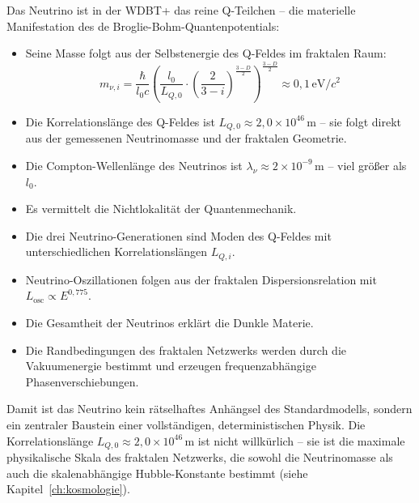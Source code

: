 Das Neutrino ist in der WDBT+ das reine Q-Teilchen – die materielle Manifestation des de Broglie-Bohm-Quantenpotentials:

\begin{itemize}
    \item Seine Masse folgt aus der Selbstenergie des Q-Feldes im fraktalen Raum:
    \[
    m_{\nu,i} = \frac{\hbar}{l_0 c} \left( \frac{l_0}{L_{Q,0}} \cdot \left(\frac{2}{3-i}\right)^{\frac{3-D}{2}} \right)^{\frac{3-D}{2}} \approx 0{,}1 \, \text{eV}/c^2
    \]
    \item Die Korrelationslänge des Q-Feldes ist \( L_{Q,0} \approx 2{,}0 \times 10^{46} \, \text{m} \) – sie folgt direkt aus der gemessenen Neutrinomasse und der fraktalen Geometrie.
    \item Die Compton-Wellenlänge des Neutrinos ist \( \lambda_\nu \approx 2 \times 10^{-9} \, \text{m} \) – viel größer als \( l_0 \).
    \item Es vermittelt die Nichtlokalität der Quantenmechanik.
    \item Die drei Neutrino-Generationen sind Moden des Q-Feldes mit unterschiedlichen Korrelationslängen \( L_{Q,i} \).
    \item Neutrino-Oszillationen folgen aus der fraktalen Dispersionsrelation mit \( L_{\text{osc}} \propto E^{0,775} \).
    \item Die Gesamtheit der Neutrinos erklärt die Dunkle Materie.
    \item Die Randbedingungen des fraktalen Netzwerks werden durch die Vakuumenergie bestimmt und erzeugen frequenzabhängige Phasenverschiebungen.
\end{itemize}

Damit ist das Neutrino kein rätselhaftes Anhängsel des Standardmodells, sondern ein zentraler Baustein einer vollständigen, deterministischen Physik. Die Korrelationslänge \( L_{Q,0} \approx 2{,}0 \times 10^{46} \, \text{m} \) ist nicht willkürlich – sie ist die maximale physikalische Skala des fraktalen Netzwerks, die sowohl die Neutrinomasse als auch die skalenabhängige Hubble-Konstante bestimmt (siehe Kapitel~\ref{ch:kosmologie}).